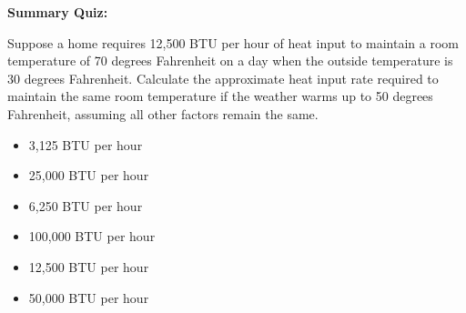 \vfil \eject

\noindent
{\bf Summary Quiz:}

Suppose a home requires 12,500 BTU per hour of heat input to maintain a room temperature of 70 degrees Fahrenheit on a day when the outside temperature is 30 degrees Fahrenheit.  Calculate the approximate heat input rate required to maintain the same room temperature if the weather warms up to 50 degrees Fahrenheit, assuming all other factors remain the same.

\begin{itemize}
\item{} 3,125 BTU per hour
\vskip 5pt 
\item{} 25,000 BTU per hour 
\vskip 5pt 
\item{} 6,250 BTU per hour
\vskip 5pt 
\item{} 100,000 BTU per hour
\vskip 5pt 
\item{} 12,500 BTU per hour 
\vskip 5pt 
\item{} 50,000 BTU per hour
\end{itemize}





